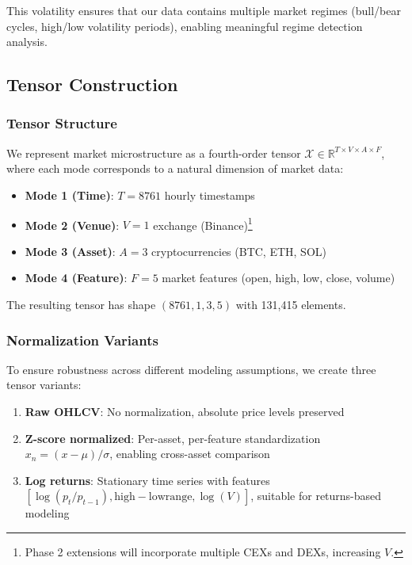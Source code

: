 \documentclass{article}
\begin{document}
This volatility ensures that our data contains multiple market regimes (bull/bear cycles, high/low volatility periods), enabling meaningful regime detection analysis.

\subsection{Tensor Construction}

\subsubsection{Tensor Structure}

We represent market microstructure as a fourth-order tensor $\mathcal{X} \in \mathbb{R}^{T \times V \times A \times F}$, where each mode corresponds to a natural dimension of market data:

\begin{itemize}[leftmargin=*]
    \item \textbf{Mode 1 (Time)}: $T = 8761$ hourly timestamps
    \item \textbf{Mode 2 (Venue)}: $V = 1$ exchange (Binance)\footnote{Phase 2 extensions will incorporate multiple CEXs and DEXs, increasing $V$.}
    \item \textbf{Mode 3 (Asset)}: $A = 3$ cryptocurrencies (BTC, ETH, SOL)
    \item \textbf{Mode 4 (Feature)}: $F = 5$ market features (open, high, low, close, volume)
\end{itemize}

The resulting tensor has shape $(8761, 1, 3, 5)$ with 131,415 elements.

\subsubsection{Normalization Variants}

To ensure robustness across different modeling assumptions, we create three tensor variants:

\begin{enumerate}[leftmargin=*]
    \item \textbf{Raw OHLCV}: No normalization, absolute price levels preserved
    \item \textbf{Z-score normalized}: Per-asset, per-feature standardization $x_{n} = (x - \mu) / \sigma$, enabling cross-asset comparison
    \item \textbf{Log returns}: Stationary time series with features $[\log(p_t / p_{t-1}), \mathrm{high-low range}, \log(V)]$, suitable for returns-based modeling
\end{enumerate}
\end{document}
